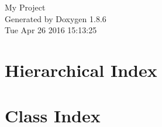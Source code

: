 \documentclass[twoside]{book}
\newcommand{\clearemptydoublepage}{%
  \newpage{\pagestyle{empty}\cleardoublepage}%
}
\begin{document}
\hypersetup{pageanchor=false}
\begin{titlepage}
\vspace*{7cm}
\begin{center}%
{\Large My Project }\\
\vspace*{1cm}
{\large Generated by Doxygen 1.8.6}\\
\vspace*{0.5cm}
{\small Tue Apr 26 2016 15:13:25}\\
\end{center}
\end{titlepage}
\clearemptydoublepage
\tableofcontents
\clearemptydoublepage
{}
\hypersetup{pageanchor=true}

\chapter{Hierarchical Index}

\chapter{Class Index}

\end{document}
